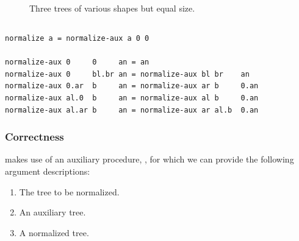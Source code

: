 \begin{figure}[htbp!]
{}
\caption[]{Three trees of various shapes but equal size.}
\label{figure:standard-representation}
\end{figure}

\subsection{}

\begin{verbatim}
normalize a = normalize-aux a 0 0

normalize-aux 0     0     an = an
normalize-aux 0     bl.br an = normalize-aux bl br    an
normalize-aux 0.ar  b     an = normalize-aux ar b     0.an
normalize-aux al.0  b     an = normalize-aux al b     0.an
normalize-aux al.ar b     an = normalize-aux ar al.b  0.an

\end{verbatim}

\subsubsection{Correctness}

 makes use of an auxiliary procedure, ,
for which we can provide the following argument descriptions:

\begin{enumerate}

\item The tree to be normalized.

\item An auxiliary tree.

\item A normalized tree.

\end{enumerate} 

